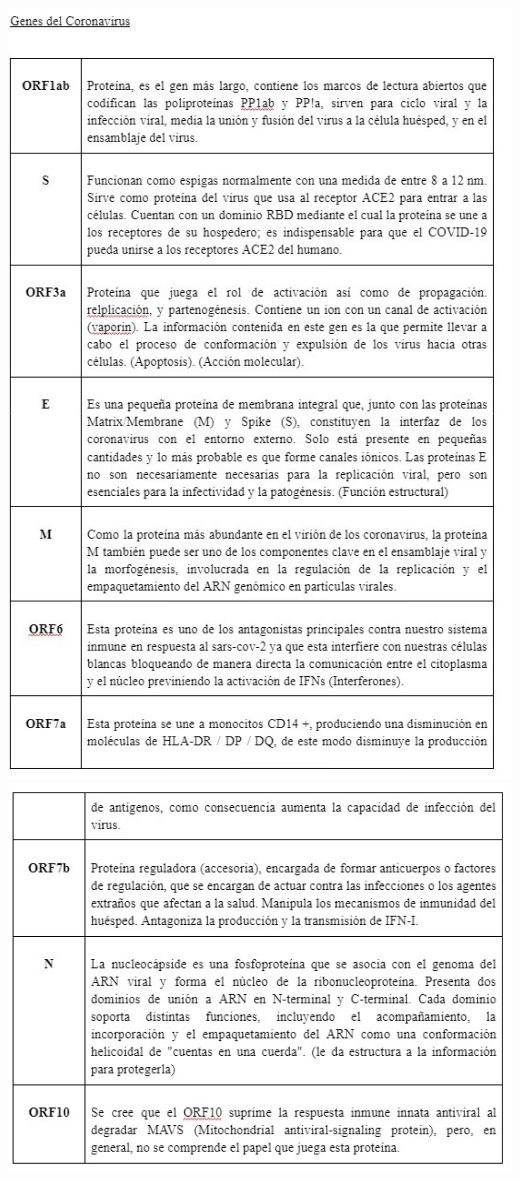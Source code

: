 \documentclass[
  12pt,
]{article}
\begin{document}
\includegraphics{Archivos/Image5.jpeg}
\includegraphics{Archivos/Image6.jpeg}
\end{document}
